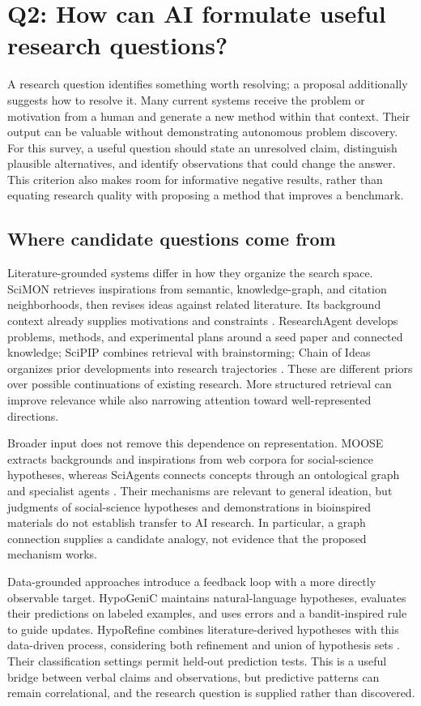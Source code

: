 \section{Q2: How can AI formulate useful research questions?}
\label{sec:questions}

A research question identifies something worth resolving; a proposal additionally suggests how to resolve it. Many current systems receive the problem or motivation from a human and generate a new method within that context. Their output can be valuable without demonstrating autonomous problem discovery. For this survey, a useful question should state an unresolved claim, distinguish plausible alternatives, and identify observations that could change the answer. This criterion also makes room for informative negative results, rather than equating research quality with proposing a method that improves a benchmark.

\subsection{Where candidate questions come from}

Literature-grounded systems differ in how they organize the search space. SciMON retrieves inspirations from semantic, knowledge-graph, and citation neighborhoods, then revises ideas against related literature. Its background context already supplies motivations and constraints \cite{scimon}. ResearchAgent develops problems, methods, and experimental plans around a seed paper and connected knowledge; SciPIP combines retrieval with brainstorming; Chain of Ideas organizes prior developments into research trajectories \cite{researchagent,scipip,chain-of-ideas}. These are different priors over possible continuations of existing research. More structured retrieval can improve relevance while also narrowing attention toward well-represented directions.

Broader input does not remove this dependence on representation. MOOSE extracts backgrounds and inspirations from web corpora for social-science hypotheses, whereas SciAgents connects concepts through an ontological graph and specialist agents \cite{moose,sciagents}. Their mechanisms are relevant to general ideation, but judgments of social-science hypotheses and demonstrations in bioinspired materials do not establish transfer to AI research. In particular, a graph connection supplies a candidate analogy, not evidence that the proposed mechanism works.

Data-grounded approaches introduce a feedback loop with a more directly observable target. HypoGeniC maintains natural-language hypotheses, evaluates their predictions on labeled examples, and uses errors and a bandit-inspired rule to guide updates. HypoRefine combines literature-derived hypotheses with this data-driven process, considering both refinement and union of hypothesis sets \cite{hypogenic,hyporefine}. Their classification settings permit held-out prediction tests. This is a useful bridge between verbal claims and observations, but predictive patterns can remain correlational, and the research question is supplied rather than discovered.

